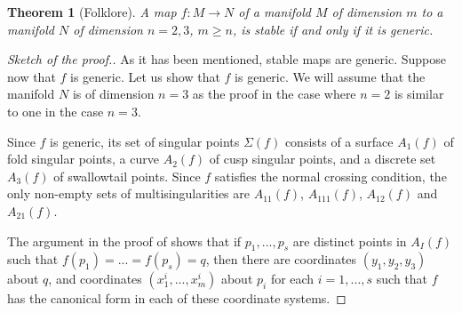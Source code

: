 \documentclass[12pt]{amsart}
\def\co{\colon}
\newtheorem{theorem}{Theorem}[section]
\theoremstyle{definition}
\begin{document}
\begin{theorem}[Folklore] A map $f\co M\to N$ of a manifold $M$ of dimension $m$ to a manifold $N$ of dimension $n=2, 3$, $m\ge n$, is stable if and only if it is generic. 
\end{theorem}

\begin{proof}[Sketch of the proof.] As it has been mentioned, stable maps are generic. Suppose now that $f$ is generic. Let us show that $f$ is generic. We will assume that the manifold $N$ is of dimension $n=3$ as the proof in the case where $n=2$ is similar to one in the case $n=3$. 

Since $f$ is generic, its set of singular points $\Sigma(f)$ consists of a surface $A_1(f)$ of fold singular points, a curve $A_2(f)$ of cusp singular points, and a discrete set  $A_3(f)$ of swallowtail points.  Since $f$ satisfies the normal crossing condition, the only non-empty sets of multisingularities are $A_{11}(f)$, $A_{111}(f)$,  $A_{12}(f)$ and $A_{21}(f)$. 

The argument in the proof of \cite[Chapter VII, Lemma 6.5]{GG} shows that if $p_1,..., p_s$ are distinct points in $A_I(f)$ such that $f(p_1)=...=f(p_s)=q$, then there are coordinates $(y_1, y_2, y_3)$ about $q$, and coordinates $(x_1^{i}, ..., x_m^{i})$ about $p_i$ for each $i=1,..., s$ such that $f$ has the canonical form in each of these coordinate systems. 


\end{proof}
\end{document}
